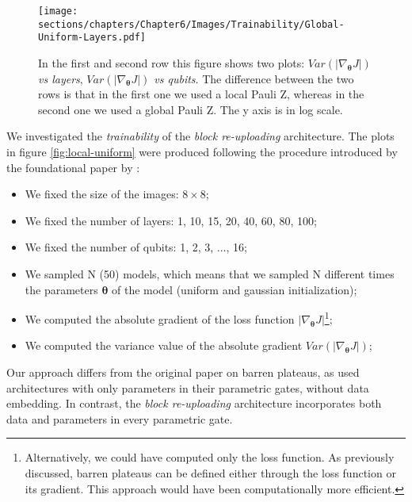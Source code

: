 \begin{figure}[h]
    \centering
    \texttt{[image: sections/chapters/Chapter6/Images/Trainability/Global-Uniform-Layers.pdf]}
    \caption{In the first and second row this figure shows two plots: \textit{$Var(|\nabla_{\bm{\theta}}J|)$ vs layers}, 
    \textit{$Var(|\nabla_{\bm{\theta}}J|)$ vs qubits}.
    The difference between the two rows is that in the first one we used a local Pauli Z, whereas in the
    second one we used a global Pauli Z.
    The y axis is in log scale.}
\end{figure}




We investigated the \textit{trainability} of the \textit{block re-uploading} architecture. 
The plots in figure \ref{fig:local-uniform} were produced following the procedure introduced by 
the foundational paper by \cite{McClean_2018}:

\begin{itemize}
    \item We fixed the size of the images: $8\times8$;
    \item We fixed the number of layers: 1, 10, 15, 20, 40, 60, 80, 100;
    \item We fixed the number of qubits: 1, 2, 3, ..., 16;
    \item We sampled N (50) models, which means that we sampled N different times the parameters 
    $\bm{\theta}$ of the model (uniform and gaussian initialization);
    \item We computed the absolute gradient of the loss function $|\nabla_{\bm{\theta}}J|$\footnote[1]{
        Alternatively, we could have computed only the loss function. As previously discussed, 
        barren plateaus can be defined either through the loss function or its gradient. 
        This approach would have been computationally more efficient.
    };
    \item We computed the variance value of the absolute gradient $Var(|\nabla_{\bm{\theta}}J|)$;
\end{itemize}

Our approach differs from the original paper on barren plateaus, as \cite{McClean_2018} 
used architectures with only parameters in their parametric gates, without data embedding. 
In contrast, the \textit{block re-uploading} architecture incorporates both data and parameters 
in every parametric gate.\\

